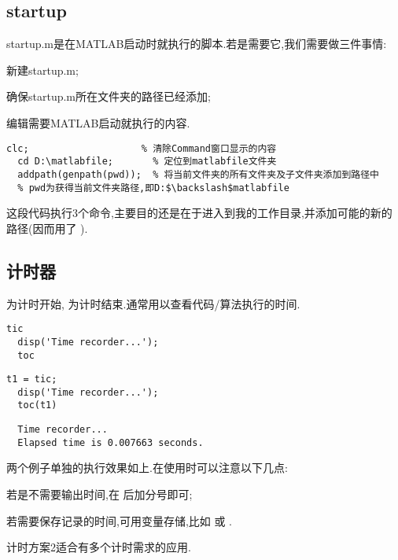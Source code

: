 \subsection{startup}
startup.m是在MATLAB启动时就执行的脚本.若是需要它,我们需要做三件事情:
\begindot
  \item 新建startup.m;
  \item 确保startup.m所在文件夹的路径已经添加;
  \item 编辑需要MATLAB启动就执行的内容.
\myenddot

\vspace{-0.8cm}
\begin{lstlisting}[caption = 我的startup.m]
  clc;                    % 清除Command窗口显示的内容
  cd D:\matlabfile;       % 定位到matlabfile文件夹
  addpath(genpath(pwd));  % 将当前文件夹的所有文件夹及子文件夹添加到路径中
  % pwd为获得当前文件夹路径,即D:$\backslash$matlabfile
\end{lstlisting}
这段代码执行3个命令,主要目的还是在于进入到我的工作目录,并添加可能的新的路径(因而用了 ).



\subsection{计时器}
 为计时开始,  为计时结束.通常用以查看代码/算法执行的时间.

\vspace{-0.8cm}
\begin{lstlisting}[caption = 计时1]
  tic
  disp('Time recorder...');
  toc
\end{lstlisting}

\vspace{-0.8cm}
\begin{lstlisting}[caption=计时2]
  t1 = tic;
  disp('Time recorder...');
  toc(t1)
\end{lstlisting}

\vspace{-0.8cm}
\begin{lstlisting}
  Time recorder...
  Elapsed time is 0.007663 seconds.
\end{lstlisting}

两个例子单独的执行效果如上.在使用时可以注意以下几点:
\begindot
  \item 若是不需要输出时间,在  后加分号即可;
  \item 若需要保存记录的时间,可用变量存储,比如  或  .
  \item 计时方案2适合有多个计时需求的应用.
\myenddot

